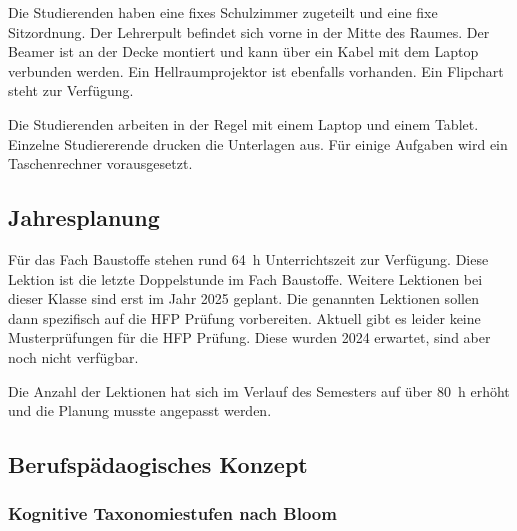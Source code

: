 \documentclass[
11pt,
captions=tableheading,
headsepline,
footsepline, 
captions=tableheading,
parskip=half-,
]{scrartcl}
\begin{document}
Die Studierenden haben eine fixes Schulzimmer zugeteilt und eine fixe Sitzordnung. Der Lehrerpult befindet sich vorne in der Mitte des Raumes. Der Beamer ist an der Decke montiert und kann über ein Kabel mit dem Laptop verbunden werden. Ein Hellraumprojektor ist ebenfalls vorhanden. Ein Flipchart steht zur Verfügung.


Die Studierenden arbeiten in der Regel mit einem Laptop und einem Tablet. Einzelne Studiererende drucken die Unterlagen aus. 
Für einige Aufgaben wird ein Taschenrechner vorausgesetzt.

\subsection{Jahresplanung}
Für das Fach Baustoffe stehen rund \SI{64}{\hour} Unterrichtszeit zur Verfügung.
Diese Lektion ist die letzte Doppelstunde im Fach Baustoffe. 
Weitere Lektionen bei dieser Klasse sind erst im Jahr 2025 geplant. 
Die genannten Lektionen sollen dann spezifisch auf die HFP Prüfung vorbereiten. Aktuell gibt es leider keine Musterprüfungen für die HFP Prüfung. Diese wurden 2024 erwartet, sind aber noch nicht verfügbar.

Die Anzahl der Lektionen hat sich im Verlauf des Semesters auf über \SI{80}{\hour} erhöht und die Planung musste angepasst werden.

\subsection{Berufspädaogisches Konzept}
\subsubsection{Kognitive Taxonomiestufen nach Bloom}
\end{document}
